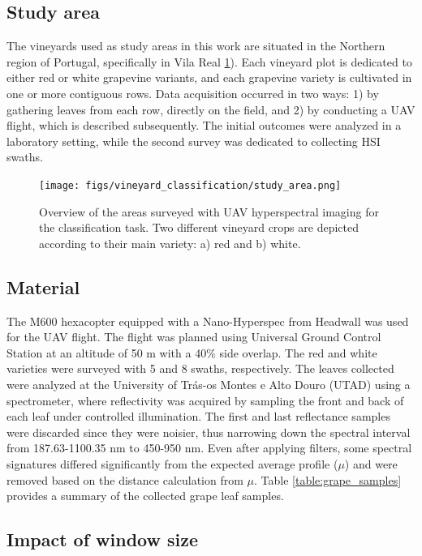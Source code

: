 \subsection{Study area}

The vineyards used as study areas in this work are situated in the Northern region of Portugal, specifically in Vila Real \ref{fig:vineyard_study_area}). Each vineyard plot is dedicated to either red or white grapevine variants, and each grapevine variety is cultivated in one or more contiguous rows. Data acquisition occurred in two ways: 1) by gathering leaves from each row, directly on the field, and 2) by conducting a UAV flight, which is described subsequently. The initial outcomes were analyzed in a laboratory setting, while the second survey was dedicated to collecting HSI swaths.

\begin{figure}[ht]
    \centering
    \texttt{[image: figs/vineyard\_classification/study\_area.png]}
	\caption{Overview of the areas surveyed with UAV hyperspectral imaging for the classification task. Two different vineyard crops are depicted according to their main variety: a) red and b) white. }
	\label{fig:vineyard_study_area}
\end{figure}

\subsection{Material}

The M600 hexacopter equipped with a Nano-Hyperspec from Headwall was used for the UAV flight. The flight was planned using Universal Ground Control Station at an altitude of 50 \si{\meter} with a 40\% side overlap. The red and white varieties were surveyed with 5 and 8 swaths, respectively. The leaves collected were analyzed at the University of Trás-os Montes e Alto Douro (UTAD) using a spectrometer, where reflectivity was acquired by sampling the front and back of each leaf under controlled illumination. The first and last reflectance samples were discarded since they were noisier, thus narrowing down the spectral interval from 187.63-1100.35 \si{\nano\meter} to 450-950 \si{\nano\meter}. Even after applying filters, some spectral signatures differed significantly from the expected average profile ($\mu$) and were removed based on the distance calculation from $\mu$. Table \ref{table:grape_samples} provides a summary of the collected grape leaf samples.

\subsection{Impact of window size}

